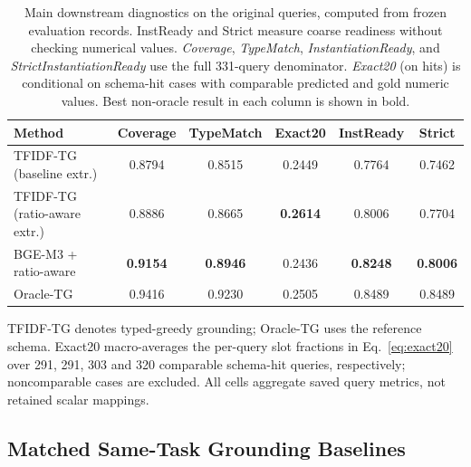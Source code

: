 \documentclass[pdflatex,sn-basic,Numbered]{sn-jnl}
\begin{document}
\begin{table}[t]
  \centering
  \caption{Main downstream diagnostics on the original queries, computed from frozen evaluation records. InstReady and Strict measure coarse readiness without checking numerical values. \textit{Coverage}, \textit{TypeMatch}, \textit{InstantiationReady}, and \textit{StrictInstantiationReady} use the full 331-query denominator. \textit{Exact20} (on hits) is conditional on schema-hit cases with comparable predicted and gold numeric values. Best non-oracle result in each column is shown in bold.}
  \label{tab:nlp4lp-downstream-main}
  \small
  \setlength{\tabcolsep}{3.2pt}
  \renewcommand{\arraystretch}{1.12}
  \begin{tabular}{@{}lccccc@{}}
    \toprule
    Method & Coverage & TypeMatch & Exact20 & InstReady & Strict \\
    \midrule
TFIDF-TG (baseline extr.) & 0.8794 & 0.8515 & 0.2449 & 0.7764 & 0.7462 \\
TFIDF-TG (ratio-aware extr.) & 0.8886 & 0.8665 & \textbf{0.2614} & 0.8006 & 0.7704 \\
BGE-M3 + ratio-aware & \textbf{0.9154} & \textbf{0.8946} & 0.2436 & \textbf{0.8248} & \textbf{0.8006} \\
Oracle-TG & 0.9416 & 0.9230 & 0.2505 & 0.8489 & 0.8489 \\
    \bottomrule
  \end{tabular}

  \vspace{2mm}
  \raggedright
  \footnotesize
  TFIDF-TG denotes typed-greedy grounding; Oracle-TG uses the reference schema. Exact20 macro-averages the per-query slot fractions in Eq.~\eqref{eq:exact20} over 291, 291, 303 and 320 comparable schema-hit queries, respectively; noncomparable cases are excluded. All cells aggregate saved query metrics, not retained scalar mappings.
\end{table}

\subsection{Matched Same-Task Grounding Baselines}
\label{subsec:exp_grounding_baselines}
\end{document}

